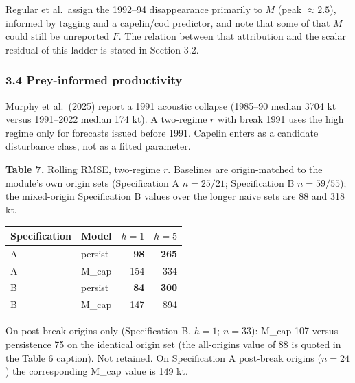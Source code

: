 \documentclass[11pt]{article}
\begin{document}
Regular et al.~assign the 1992--94 disappearance primarily to \(M\)
(peak \(\approx 2.5\)), informed by tagging and a capelin/cod predictor,
and note that some of that \(M\) could still be unreported \(F\). The
relation between that attribution and the scalar residual of this ladder
is stated in Section 3.2.

\subsubsection{3.4 Prey-informed
productivity}\label{prey-informed-productivity}

Murphy et al.~(2025) report a 1991 acoustic collapse (1985--90 median
3704 kt versus 1991--2022 median 174 kt). A two-regime \(r\) with break
1991 uses the high regime only for forecasts issued before 1991. Capelin
enters as a candidate disturbance class, not as a fitted parameter.

\textbf{Table 7.} Rolling RMSE, two-regime \(r\). Baselines are origin-matched to the module's own origin sets (Specification A \(n=25/21\); Specification B \(n=59/55\)); the mixed-origin Specification B values over the longer naive sets are 88 and 318 kt.

\begin{longtable}[]{@{}llrr@{}}
\toprule\noalign{}
Specification & Model & \(h=1\) & \(h=5\) \\
\midrule\noalign{}
\endhead
\bottomrule\noalign{}
\endlastfoot
A & persist & \textbf{98} & \textbf{265} \\
A & M\_cap & 154 & 334 \\
B & persist & \textbf{84} & \textbf{300} \\
B & M\_cap & 147 & 894 \\
\end{longtable}

On post-break origins only (Specification B, \(h=1\); \(n=33\)): M\_cap
107 versus persistence 75 on the identical origin set (the all-origins value
of 88 is quoted in the Table 6 caption). Not retained. On Specification A post-break
origins (\(n=24\)) the corresponding M\_cap value is 149 kt.
\end{document}
